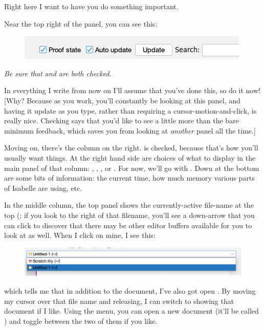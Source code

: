 Right here I want to have you do something important. 

\task
Near the top right of the 
 panel, you can see this:
\begin{figure}[h]
    \centering
    \includegraphics[width=0.75\linewidth]{TEXT/C01//Images/image.png}
\end{figure}
\textit{Be sure that  and  are both checked.} 
\etask

In everything I write from now on I'll assume that you've done this, so do it now! [Why? Because as you work, you'll constantly be looking at this panel, and having it update as you type, rather than requiring a cursor-motion-and-click, is really nice. Checking  says that you'd like to see a little more than the bare minimum feedback, which saves you from looking at \textit{another} panel all the time.]

Moving on, there's the column on the right.  is checked, because that's how you'll usually want things. At the right hand side are choices of what to display in the main panel of that column: , , , or . For now, we'll go with . Down at the bottom are some bits of information: the current time, how much memory various parts of Isabelle are using, etc. 

In the middle column, the top panel shows the currently-active file-name at the top (; if you look to the right of that filename, you'll see a down-arrow that you can click to discover that there may be other editor buffers available for you to look at as well. When I click on mine, I see this:
\begin{figure}
    \centering
    \includegraphics[width=1\linewidth]{TEXT/C01//Images/file-list.png}
\end{figure}
which tells me that in addition to the  document, I've also got open . By moving my cursor over that file name and releasing, I can switch to showing that document if I like. Using the  menu, you can open a new document (it'll be called ) and toggle between the two of them if you like.

